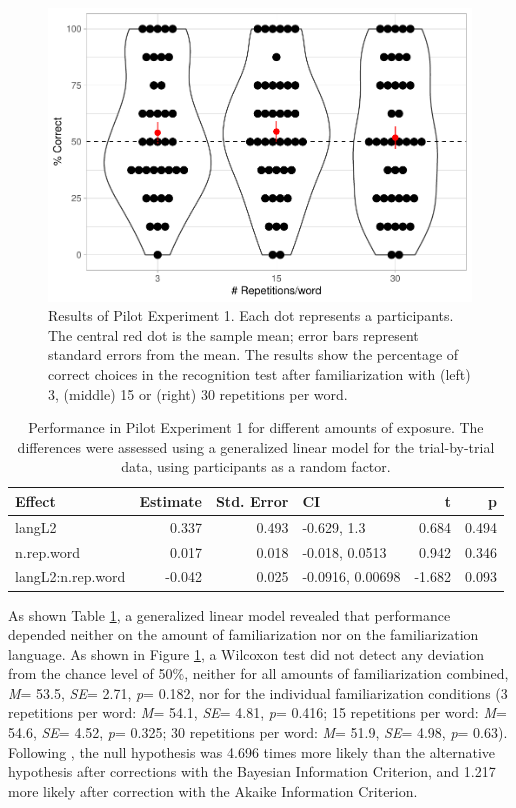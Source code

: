 \documentclass[]{article}
\newcommand{\p}{{\em p\/}}
\newcommand{\M}{{\em M\/}}
\newcommand{\SE}{{\em SE\/}}
\begin{document}
\begin{figure}

{\centering \includegraphics[width=0.8\linewidth]{segmentation_recall_combined_files/figure-latex/bcn-plot-stats-1} 

}

\caption{Results of Pilot Experiment 1. Each dot represents a participants. The central red dot is the sample mean; error bars represent standard errors from the mean. The results show the percentage of correct choices in the recognition test after familiarization with (left) 3, (middle) 15  or (right) 30 repetitions per word.}\label{fig:bcn-plot-stats}
\end{figure}

\begin{table}

\caption{\label{tab:bcn-glmm-print}Performance in Pilot Experiment 1 for different amounts of exposure. The differences were assessed using a generalized linear model for the trial-by-trial data, using participants as a random factor.}
\centering
\begin{tabular}[t]{lrrlrr}
\toprule
Effect & Estimate & Std. Error & CI & t & p\\
\midrule
langL2 & 0.337 & 0.493 & -0.629, 1.3 & 0.684 & 0.494\\
n.rep.word & 0.017 & 0.018 & -0.018, 0.0513 & 0.942 & 0.346\\
langL2:n.rep.word & -0.042 & 0.025 & -0.0916, 0.00698 & -1.682 & 0.093\\
\bottomrule
\end{tabular}
\end{table}

As shown Table \ref{tab:bcn-glmm-print}, a generalized linear model
revealed that performance depended neither on the amount of
familiarization nor on the familiarization language. As shown in Figure
\ref{fig:bcn-plot-stats}, a Wilcoxon test did not detect any deviation
from the chance level of 50\%, neither for all amounts of
familiarization combined, \M = 53.5, \SE = 2.71, \p = 0.182, nor for the
individual familiarization conditions (3 repetitions per word: \M =
54.1, \SE = 4.81, \p = 0.416; 15 repetitions per word: \M = 54.6, \SE =
4.52, \p = 0.325; 30 repetitions per word: \M = 51.9, \SE = 4.98, \p =
0.63). Following \citet{Glover2004}, the null hypothesis was 4.696 times
more likely than the alternative hypothesis after corrections with the
Bayesian Information Criterion, and 1.217 more likely after correction
with the Akaike Information Criterion.

\clearpage


\end{document}

